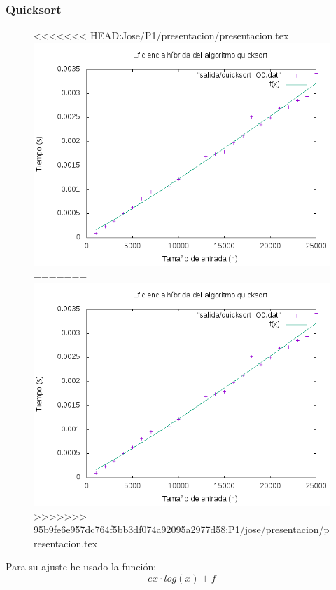 \documentclass[spanish]{beamer}
\begin{document}
   \begin{frame}\frametitle{Quicksort}
    \begin{figure}[H]
    \centering   
<<<<<<< HEAD:Jose/P1/presentacion/presentacion.tex
    \includegraphics[clip,width=0.6\columnwidth]{../plots/quicksort_O0_fit.png}%
=======
    \includegraphics[clip,width=0.76\columnwidth]{../plots/quicksort_O0_fit.png}%
>>>>>>> 95b9fe6e957dc764f5bb3df074a92095a2977d58:P1/jose/presentacion/presentacion.tex
    \end{figure}

    Para su ajuste he usado la función: $$ex\cdot log(x)+f$$
       
  \end{frame}
\end{document}
